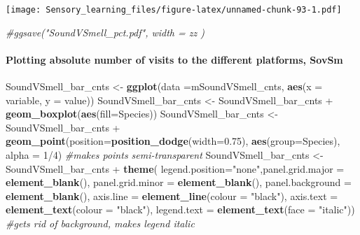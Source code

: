 \documentclass[]{article}
\newenvironment{Shaded}{\begin{snugshade}}{\end{snugshade}}
\newcommand{\KeywordTok}[1]{\textcolor[rgb]{0.13,0.29,0.53}{\textbf{{#1}}}}
\newcommand{\DataTypeTok}[1]{\textcolor[rgb]{0.13,0.29,0.53}{{#1}}}
\newcommand{\DecValTok}[1]{\textcolor[rgb]{0.00,0.00,0.81}{{#1}}}
\newcommand{\FloatTok}[1]{\textcolor[rgb]{0.00,0.00,0.81}{{#1}}}
\newcommand{\StringTok}[1]{\textcolor[rgb]{0.31,0.60,0.02}{{#1}}}
\newcommand{\CommentTok}[1]{\textcolor[rgb]{0.56,0.35,0.01}{\textit{{#1}}}}
\newcommand{\NormalTok}[1]{{#1}}
\let\oldparagraph\paragraph
\renewcommand{\paragraph}[1]{\oldparagraph{#1}\mbox{}}
\begin{document}
\texttt{[image: Sensory\_learning\_files/figure-latex/unnamed-chunk-93-1.pdf]}

\begin{Shaded}
\begin{Highlighting}[]
\CommentTok{#ggsave("SoundVSmell_pct.pdf", width = zz  )}
\end{Highlighting}
\end{Shaded}

\paragraph{Plotting absolute number of visits to the different
platforms,
SovSm}\label{plotting-absolute-number-of-visits-to-the-different-platforms-sovsm-1}

\begin{Shaded}
\begin{Highlighting}[]
\NormalTok{SoundVSmell_bar_cnts <-}\StringTok{ }\KeywordTok{ggplot}\NormalTok{(}\DataTypeTok{data =}\NormalTok{mSoundVSmell_cnts, }\KeywordTok{aes}\NormalTok{(}\DataTypeTok{x =} \NormalTok{variable, }\DataTypeTok{y =} \NormalTok{value))}
\NormalTok{SoundVSmell_bar_cnts <-}\StringTok{ }\NormalTok{SoundVSmell_bar_cnts +}\StringTok{ }\KeywordTok{geom_boxplot}\NormalTok{(}\KeywordTok{aes}\NormalTok{(}\DataTypeTok{fill=}\NormalTok{Species))}
\NormalTok{SoundVSmell_bar_cnts <-}\StringTok{ }\NormalTok{SoundVSmell_bar_cnts +}\StringTok{ }\KeywordTok{geom_point}\NormalTok{(}\DataTypeTok{position=}\KeywordTok{position_dodge}\NormalTok{(}\DataTypeTok{width=}\FloatTok{0.75}\NormalTok{), }\KeywordTok{aes}\NormalTok{(}\DataTypeTok{group=}\NormalTok{Species), }\DataTypeTok{alpha =} \DecValTok{1}\NormalTok{/}\DecValTok{4}\NormalTok{) }\CommentTok{#makes points semi-transparent}
\NormalTok{SoundVSmell_bar_cnts <-}\StringTok{ }\NormalTok{SoundVSmell_bar_cnts +}\StringTok{  }\KeywordTok{theme}\NormalTok{( }\DataTypeTok{legend.position=}\StringTok{"none"}\NormalTok{,}\DataTypeTok{panel.grid.major =} \KeywordTok{element_blank}\NormalTok{(), }\DataTypeTok{panel.grid.minor =} \KeywordTok{element_blank}\NormalTok{(),}
\DataTypeTok{panel.background =} \KeywordTok{element_blank}\NormalTok{(), }\DataTypeTok{axis.line =} \KeywordTok{element_line}\NormalTok{(}\DataTypeTok{colour =} \StringTok{"black"}\NormalTok{), }\DataTypeTok{axis.text =} \KeywordTok{element_text}\NormalTok{(}\DataTypeTok{colour =} \StringTok{"black"}\NormalTok{), }\DataTypeTok{legend.text =} \KeywordTok{element_text}\NormalTok{(}\DataTypeTok{face =} \StringTok{"italic"}\NormalTok{))  }\CommentTok{#gets rid of background, makes legend italic}

\end{Highlighting}
\end{Shaded}
\end{document}
